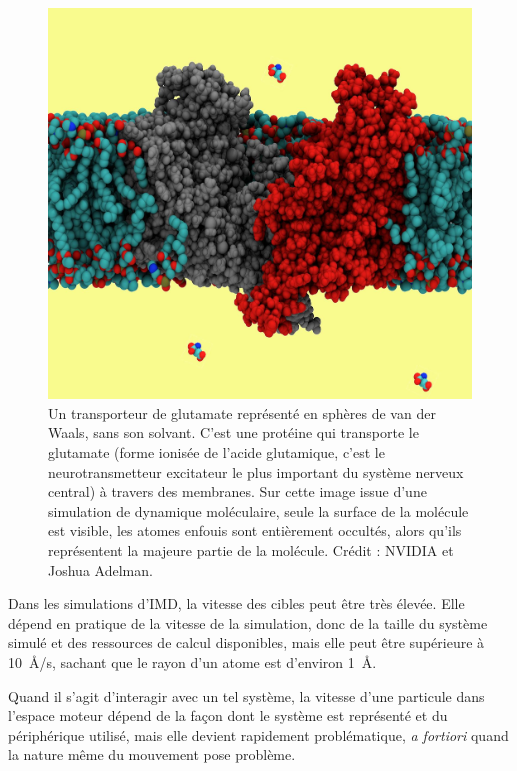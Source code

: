 	\begin{figure}[htb]
		\centering
		\includegraphics[width=\textwidth]{figures/ch1/gluTrans}
		\caption[Transporteur de glutamate, très forte occultation.]{Un transporteur de glutamate représenté en sphères de van der Waals, sans son solvant. C'est une protéine qui transporte le glutamate (forme ionisée de l'acide glutamique, c'est le neurotransmetteur excitateur le plus important du système nerveux central) à travers des membranes. Sur cette image issue d'une simulation de dynamique moléculaire, seule la surface de la molécule est visible, les atomes \og enfouis \fg{} sont entièrement occultés, alors qu'ils représentent la majeure partie de la molécule. Crédit : NVIDIA et Joshua Adelman\footnotemark.}
		\label{fig:gluTrans}
	\end{figure}
	
	
	Dans les simulations d'IMD, la vitesse des cibles peut être très élevée. Elle dépend en pratique de la vitesse de la simulation, donc de la taille du système simulé et des ressources de calcul disponibles, mais elle peut être supérieure à 10~\r{A}/s, sachant que le rayon d'un atome est d'environ 1~\r{A}.
	
	Quand il s'agit d'interagir avec un tel système, la vitesse d'une particule dans l'espace moteur dépend de la façon dont le système est représenté et du périphérique utilisé, mais elle devient rapidement problématique, \emph{a fortiori} quand la nature même du mouvement pose problème.
	
